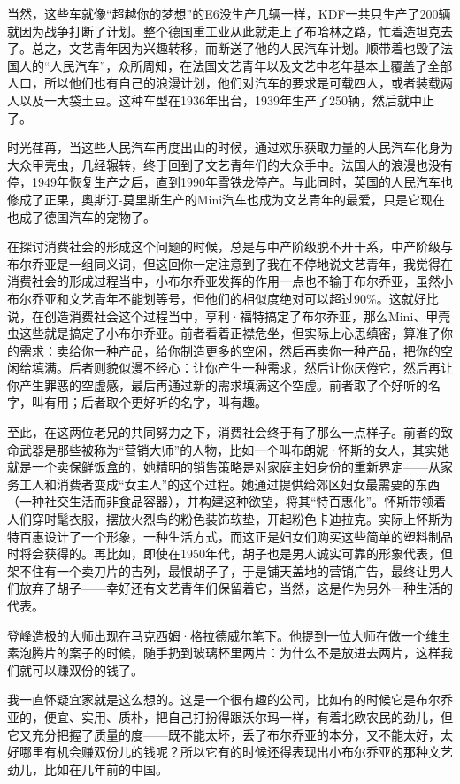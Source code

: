 当然，这些车就像``超越你的梦想''的E6没生产几辆一样，KDF一共只生产了200辆就因为战争打断了计划。整个德国重工业从此就走上了布哈林之路，忙着造坦克去了。总之，文艺青年因为兴趣转移，而断送了他的人民汽车计划。顺带着也毁了法国人的``人民汽车''，众所周知，在法国文艺青年以及文艺中老年基本上覆盖了全部人口，所以他们也有自己的浪漫计划，他们对汽车的要求是可载四人，或者装载两人以及一大袋土豆。这种车型在1936年出台，1939年生产了250辆，然后就中止了。

时光荏苒，当这些人民汽车再度出山的时候，通过欢乐获取力量的人民汽车化身为大众甲壳虫，几经辗转，终于回到了文艺青年们的大众手中。法国人的浪漫也没有停，1949年恢复生产之后，直到1990年雪铁龙停产。与此同时，英国的人民汽车也修成了正果，奥斯汀-莫里斯生产的Mini汽车也成为文艺青年的最爱，只是它现在也成了德国汽车的宠物了。

在探讨消费社会的形成这个问题的时候，总是与中产阶级脱不开干系，中产阶级与布尔乔亚是一组同义词，但这回你一定注意到了我在不停地说文艺青年，我觉得在消费社会的形成过程当中，小布尔乔亚发挥的作用一点也不输于布尔乔亚，虽然小布尔乔亚和文艺青年不能划等号，但他们的相似度绝对可以超过90\%。这就好比说，在创造消费社会这个过程当中，亨利·福特搞定了布尔乔亚，那么Mini、甲壳虫这些就是搞定了小布尔乔亚。前者看着正襟危坐，但实际上心思缜密，算准了你的需求：卖给你一种产品，给你制造更多的空闲，然后再卖你一种产品，把你的空闲给填满。后者则貌似漫不经心：让你产生一种需求，然后让你厌倦它，然后再让你产生罪恶的空虚感，最后再通过新的需求填满这个空虚。前者取了个好听的名字，叫有用；后者取个更好听的名字，叫有趣。

至此，在这两位老兄的共同努力之下，消费社会终于有了那么一点样子。前者的致命武器是那些被称为``营销大师''的人物，比如一个叫布朗妮·怀斯的女人，其实她就是一个卖保鲜饭盒的，她精明的销售策略是对家庭主妇身份的重新界定------从家务工人和消费者变成``女主人''的这个过程。她通过提供给郊区妇女最需要的东西（一种社交生活而非食品容器），并构建这种欲望，将其``特百惠化''。怀斯带领着人们穿时髦衣服，摆放火烈鸟的粉色装饰软垫，开起粉色卡迪拉克。实际上怀斯为特百惠设计了一个形象，一种生活方式，而这正是妇女们购买这些简单的塑料制品时将会获得的。再比如，即使在1950年代，胡子也是男人诚实可靠的形象代表，但架不住有一个卖刀片的吉列，最恨胡子了，于是铺天盖地的营销广告，最终让男人们放弃了胡子------幸好还有文艺青年们保留着它，当然，这是作为另外一种生活的代表。

登峰造极的大师出现在马克西姆·格拉德威尔笔下。他提到一位大师在做一个维生素泡腾片的案子的时候，随手扔到玻璃杯里两片：为什么不是放进去两片，这样我们就可以赚双份的钱了。

我一直怀疑宜家就是这么想的。这是一个很有趣的公司，比如有的时候它是布尔乔亚的，便宜、实用、质朴，把自己打扮得跟沃尔玛一样，有着北欧农民的劲儿，但它又充分把握了质量的度------既不能太坏，丢了布尔乔亚的本分，又不能太好，太好哪里有机会赚双份儿的钱呢？所以它有的时候还得表现出小布尔乔亚的那种文艺劲儿，比如在几年前的中国。

